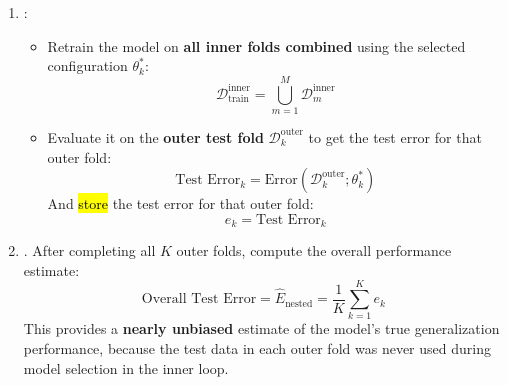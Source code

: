 \begin{enumerate}
\begin{itemize}
        \begin{equation*}
            \theta^{*}_{k} = \arg\min_{\theta} \left(
                \dfrac{1}{M} \cdot \sum_{m=1}^{M} \text{Error}\left( \mathcal{D}_m^{\text{inner, val}}; \theta \right)
            \right)
        \end{equation*}
    \end{itemize}
    \item {}:
    \begin{itemize}
        \item Retrain the model on \textbf{all inner folds combined} using the selected configuration $\theta^{*}_{k}$:
        \begin{equation*}
            \mathcal{D}_{\text{train}}^{\text{inner}} = \bigcup_{m=1}^{M} \mathcal{D}_m^{\text{inner}}
        \end{equation*}
        \item Evaluate it on the \textbf{outer test fold} $\mathcal{D}_k^{\text{outer}}$ to get the test error for that outer fold:
        \begin{equation*}
            \text{Test Error}_k = \text{Error}\left( \mathcal{D}_k^{\text{outer}}; \theta^{*}_{k} \right)
        \end{equation*}
        And \hl{store} the test error for that outer fold:
        \begin{equation*}
            e_k = \text{Test Error}_k
        \end{equation*}
    \end{itemize}
    \item {}. After completing all $K$ outer folds, compute the overall performance estimate:
    \begin{equation*}
        \text{Overall Test Error} = \hat{E}_{\text{nested}} = \frac{1}{K} \sum_{k=1}^{K} e_k
    \end{equation*}
    This provides a \textbf{nearly unbiased} estimate of the model's true generalization performance, because the test data in each outer fold was never used during model selection in the inner loop.
\end{enumerate}
